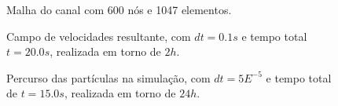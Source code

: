 \documentclass{beamer}
\begin{document}
\begin{frame}
  \frametitle{\subsecname}
  
  \begin{figure}
     {\raggedleft \tiny Malha do canal com 600 nós e 1047 elementos.}
  \end{figure}
  \begin{figure}
     {\raggedleft \tiny Campo de velocidades resultante, com $dt=0.1s$ e tempo total $t=20.0s$, realizada em torno de $2h$.}
  \end{figure}
  \vspace*{-\baselineskip}\setlength\belowdisplayshortskip{0pt} %
  \begin{figure}
     {\raggedleft \tiny Percurso das partículas na simulação, com $dt=5E^{-5}$ e tempo total de $t=15.0s$, realizada em torno de $24h$.}
  \end{figure}
\end{frame}
\end{document}
